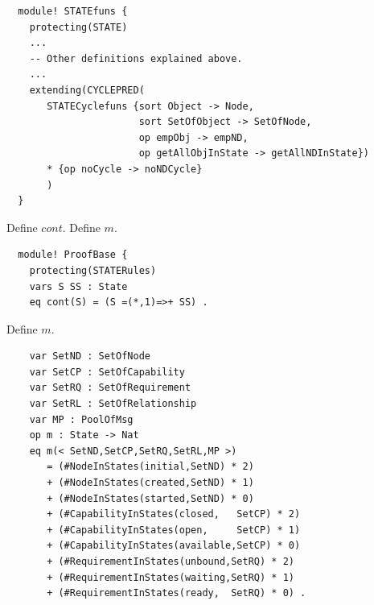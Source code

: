 \documentclass[12pt]{report}
\begin{document}
\small
\begin{verbatim}
  module! STATEfuns {
    protecting(STATE)
    ... 
    -- Other definitions explained above.
    ... 
    extending(CYCLEPRED(
       STATECyclefuns {sort Object -> Node,
                       sort SetOfObject -> SetOfNode,
                       op empObj -> empND,
                       op getAllObjInState -> getAllNDInState})
       * {op noCycle -> noNDCycle}
       )
  }
\end{verbatim}
\normalsize

 Define $cont$.
 Define $m$.
\small
\begin{verbatim}
  module! ProofBase {
    protecting(STATERules)
    vars S SS : State
    eq cont(S) = (S =(*,1)=>+ SS) .
\end{verbatim}
\normalsize

 Define $m$.
\small
\begin{verbatim}
    var SetND : SetOfNode
    var SetCP : SetOfCapability
    var SetRQ : SetOfRequirement
    var SetRL : SetOfRelationship
    var MP : PoolOfMsg
    op m : State -> Nat
    eq m(< SetND,SetCP,SetRQ,SetRL,MP >)
       = (#NodeInStates(initial,SetND) * 2)
       + (#NodeInStates(created,SetND) * 1)
       + (#NodeInStates(started,SetND) * 0)
       + (#CapabilityInStates(closed,   SetCP) * 2)
       + (#CapabilityInStates(open,     SetCP) * 1)
       + (#CapabilityInStates(available,SetCP) * 0)
       + (#RequirementInStates(unbound,SetRQ) * 2)
       + (#RequirementInStates(waiting,SetRQ) * 1)
       + (#RequirementInStates(ready,  SetRQ) * 0) .
\end{verbatim}
\normalsize
\end{document}
